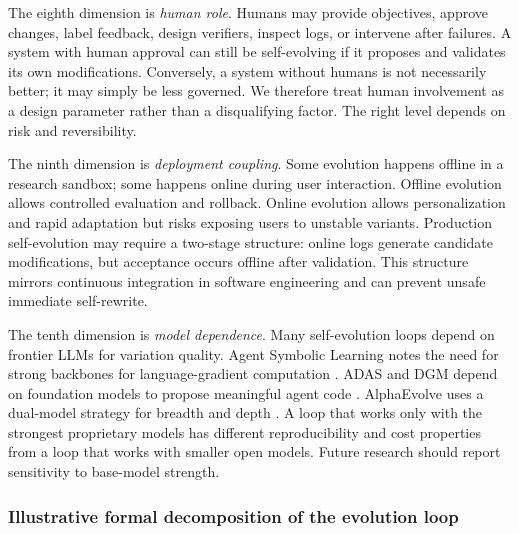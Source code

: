 The eighth dimension is \emph{human role}. Humans may provide objectives, approve changes, label feedback, design verifiers, inspect logs, or intervene after failures. A system with human approval can still be self-evolving if it proposes and validates its own modifications. Conversely, a system without humans is not necessarily better; it may simply be less governed. We therefore treat human involvement as a design parameter rather than a disqualifying factor. The right level depends on risk and reversibility.

The ninth dimension is \emph{deployment coupling}. Some evolution happens offline in a research sandbox; some happens online during user interaction. Offline evolution allows controlled evaluation and rollback. Online evolution allows personalization and rapid adaptation but risks exposing users to unstable variants. Production self-evolution may require a two-stage structure: online logs generate candidate modifications, but acceptance occurs offline after validation. This structure mirrors continuous integration in software engineering and can prevent unsafe immediate self-rewrite.

The tenth dimension is \emph{model dependence}. Many self-evolution loops depend on frontier LLMs for variation quality. Agent Symbolic Learning notes the need for strong backbones for language-gradient computation \cite{agentsymboliclearning2024}. ADAS and DGM depend on foundation models to propose meaningful agent code \cite{adas2025,darwingodelmachine2025}. AlphaEvolve uses a dual-model strategy for breadth and depth \cite{alphaevolve2025}. A loop that works only with the strongest proprietary models has different reproducibility and cost properties from a loop that works with smaller open models. Future research should report sensitivity to base-model strength.

\subsubsection{Illustrative formal decomposition of the evolution loop}

